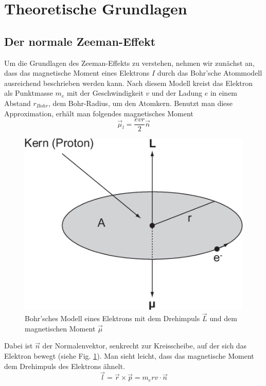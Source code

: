 \section{Theoretische Grundlagen}

\subsection{Der normale Zeeman-Effekt}
Um die Grundlagen des Zeeman-Effekts zu verstehen, nehmen wir zunächst an, dass das magnetische Moment eines Elektrons $I$ durch das Bohr'sche Atommodell ausreichend beschrieben werden kann. Nach diesem Modell kreist das Elektron als Punktmasse $m_e$ mit der Geschwindigkeit $v$ und der Ladung $e$ in einem Abstand $r_{Bohr}$, dem Bohr-Radius, um den Atomkern.
Benutzt man diese Approximation, erhält man folgendes magnetisches Moment
\begin{equation} \label{eq:1}
\vec{\mu}_l = \frac{evr}{2} \vec{n}
\end{equation}

\begin{figure}
  \includegraphics[width=\linewidth]{images/BohrscherDrehimpuls.png}
  \caption{\cite{ETH} Bohr'sches Modell eines Elektrons mit dem Drehimpuls $\vec{L}$ und dem magnetischen Moment $\vec{\mu}$}
  \label{fig:Bohr}
\end{figure}

Dabei ist $\vec{n}$ der Normalenvektor, senkrecht zur Kreisscheibe, auf der sich das Elektron bewegt (siehe Fig. \ref{fig:Bohr}).
Man sieht leicht, dass das magnetische Moment dem Drehimpuls des Elektrons ähnelt.
\begin{equation} \label{eq:2}
\vec{l} = \vec{r} \times \vec{p} = m_e r v \cdot \vec{n}
\end{equation}

